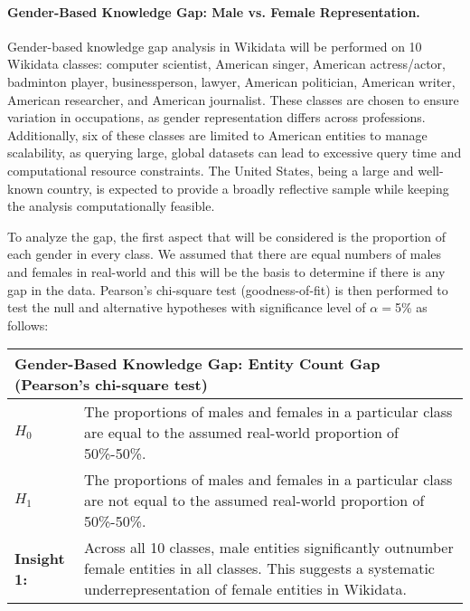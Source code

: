 \paragraph{Gender-Based Knowledge Gap: Male vs. Female Representation.}
Gender-based knowledge gap analysis in Wikidata will be performed on 10 Wikidata classes: computer scientist, American singer, American actress/actor, badminton player, businessperson, lawyer, American politician, American writer, American researcher, and American journalist. These classes are chosen to ensure variation in occupations, as gender representation differs across professions. Additionally, six of these classes are limited to American entities to manage scalability, as querying large, global datasets can lead to excessive query time and computational resource constraints. The United States, being a large and well-known country, is expected to provide a broadly reflective sample while keeping the analysis computationally feasible.

To analyze the gap, the first aspect that will be considered is the proportion of each gender in every class. We assumed that there are equal numbers of males and females in real-world and this will be the basis to determine if there is any gap in the data. Pearson's chi-square test (goodness-of-fit) is then performed to test the null and alternative hypotheses with significance level of \(\alpha=\)5\% as follows:



\begin{table}[h]
    \centering
    \renewcommand{\arraystretch}{1.3}
    \begin{tabular}{|l p{12cm}|} 
        \hline
        \multicolumn{2}{|l|}{\textbf{Gender-Based Knowledge Gap: Entity Count Gap (Pearson's chi-square test)}} \\
        \hline
        \textbf{$H_0$} & The proportions of males and females in a particular class are equal to the assumed real-world proportion of 50\%-50\%. \\
        \textbf{$H_1$} & The proportions of males and females in a particular class are not equal to the assumed real-world proportion of 50\%-50\%. \\
        \hline
        \textbf{Insight 1:} & Across all 10 classes, male entities significantly outnumber female entities in all classes. This suggests a systematic underrepresentation of female entities in Wikidata. \\
        \hline
    \end{tabular}
\end{table}

